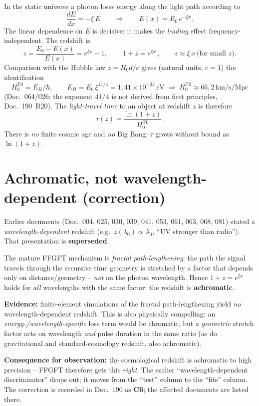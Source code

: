 In the static universe a photon loses energy along the light path according to
\[
  \frac{dE}{dx} = -\xi\,E
  \qquad\Longrightarrow\qquad
  E(x) = E_0\,e^{-\xi x}.
\]
The linear dependence on $E$ is decisive: it makes the \emph{leading} effect
frequency-independent. The redshift is
\[
  z = \frac{E_0 - E(x)}{E(x)} = e^{\xi x} - 1,
  \qquad
  \boxed{\,1+z = e^{\xi x}\,},
  \qquad z \approx \xi\,x \ \text{(for small } z).
\]
Comparison with the Hubble law $z = H_0 d/c$ gives (natural units, $c=1$) the
identification
\[
  H_0^{\text{T0}} = E_H/\hbar,\qquad E_H = E_0\,\xi^{41/4} = 1{,}41\times10^{-33}\,\text{eV}
  \;\Rightarrow\; H_0^{\text{T0}} \approx 66{,}2\,\text{km/s/Mpc}
\]
(Doc.~064/026; the exponent $41/4$ is not derived from first principles,
Doc.~190~R20). The \emph{light-travel time} to an object at redshift $z$ is therefore
\[
  \boxed{\,\tau(z) = \frac{\ln(1+z)}{H_0^{\text{T0}}}\,}.
\]
There is \emph{no} finite cosmic age and \emph{no} Big Bang: $\tau$ grows without
bound as $\ln(1+z)$.

\section{Achromatic, not wavelength-dependent (correction)}

Earlier documents (Doc.~004, 025, 030, 039, 041, 053, 061, 063, 068, 081) stated a
\emph{wavelength-dependent} redshift (e.g.\ $z(\lambda_0)\propto\lambda_0$,
\enquote{UV stronger than radio}). That presentation is \textbf{superseded}.

The mature FFGFT mechanism is \emph{fractal path-lengthening}: the path the signal
travels through the recursive time geometry is stretched by a factor that depends
only on distance/geometry -- \emph{not} on the photon wavelength. Hence
$1+z = e^{\xi x}$ holds for \emph{all} wavelengths with the same factor: the redshift
is \textbf{achromatic}.

\textbf{Evidence:} finite-element simulations of the fractal path-lengthening yield
\emph{no} wavelength-dependent redshift. This is also physically compelling: an
\emph{energy-/wavelength-specific} loss term would be chromatic, but a
\emph{geometric} stretch factor acts on wavelength \emph{and} pulse duration in the
same ratio (as do gravitational and standard-cosmology redshift, also achromatic).

\textbf{Consequence for observation:} the cosmological redshift is achromatic to high
precision -- FFGFT therefore gets this \emph{right}. The earlier
\enquote{wavelength-dependent discriminator} drops out; it moves from the
\enquote{test} column to the \enquote{fits} column. The correction is recorded in
Doc.~190 as \textbf{C6}; the affected documents are listed there.

